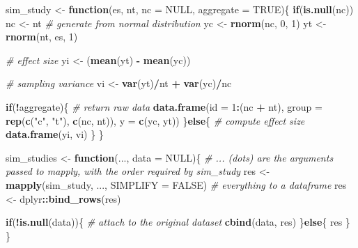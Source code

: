 \documentclass[
  man,floatsintext]{apa6}
\newenvironment{Shaded}{\begin{snugshade}}{\end{snugshade}}
\newcommand{\AttributeTok}[1]{\textcolor[rgb]{0.13,0.29,0.53}{#1}}
\newcommand{\CommentTok}[1]{\textcolor[rgb]{0.56,0.35,0.01}{\textit{#1}}}
\newcommand{\ConstantTok}[1]{\textcolor[rgb]{0.56,0.35,0.01}{#1}}
\newcommand{\ControlFlowTok}[1]{\textcolor[rgb]{0.13,0.29,0.53}{\textbf{#1}}}
\newcommand{\DecValTok}[1]{\textcolor[rgb]{0.00,0.00,0.81}{#1}}
\newcommand{\FunctionTok}[1]{\textcolor[rgb]{0.13,0.29,0.53}{\textbf{#1}}}
\newcommand{\NormalTok}[1]{#1}
\newcommand{\OtherTok}[1]{\textcolor[rgb]{0.56,0.35,0.01}{#1}}
\newcommand{\SpecialCharTok}[1]{\textcolor[rgb]{0.81,0.36,0.00}{\textbf{#1}}}
\newcommand{\StringTok}[1]{\textcolor[rgb]{0.31,0.60,0.02}{#1}}
\begin{document}
\begin{Shaded}
\begin{Highlighting}[]

\NormalTok{sim\_study }\OtherTok{\textless{}{-}} \ControlFlowTok{function}\NormalTok{(es, nt, }\AttributeTok{nc =} \ConstantTok{NULL}\NormalTok{, }\AttributeTok{aggregate =} \ConstantTok{TRUE}\NormalTok{)\{}
  \ControlFlowTok{if}\NormalTok{(}\FunctionTok{is.null}\NormalTok{(nc)) nc }\OtherTok{\textless{}{-}}\NormalTok{ nt}
  \CommentTok{\# generate from normal distribution}
\NormalTok{  yc }\OtherTok{\textless{}{-}} \FunctionTok{rnorm}\NormalTok{(nc, }\DecValTok{0}\NormalTok{, }\DecValTok{1}\NormalTok{)}
\NormalTok{  yt }\OtherTok{\textless{}{-}} \FunctionTok{rnorm}\NormalTok{(nt, es, }\DecValTok{1}\NormalTok{)}
  
  \CommentTok{\# effect size}
\NormalTok{  yi }\OtherTok{\textless{}{-}}\NormalTok{ (}\FunctionTok{mean}\NormalTok{(yt) }\SpecialCharTok{{-}} \FunctionTok{mean}\NormalTok{(yc))}
  
  \CommentTok{\# sampling variance}
\NormalTok{  vi }\OtherTok{\textless{}{-}} \FunctionTok{var}\NormalTok{(yt)}\SpecialCharTok{/}\NormalTok{nt }\SpecialCharTok{+} \FunctionTok{var}\NormalTok{(yc)}\SpecialCharTok{/}\NormalTok{nc}
  
  \ControlFlowTok{if}\NormalTok{(}\SpecialCharTok{!}\NormalTok{aggregate)\{}
    \CommentTok{\# return raw data}
    \FunctionTok{data.frame}\NormalTok{(}\AttributeTok{id =} \DecValTok{1}\SpecialCharTok{:}\NormalTok{(nc }\SpecialCharTok{+}\NormalTok{ nt),}
               \AttributeTok{group =} \FunctionTok{rep}\NormalTok{(}\FunctionTok{c}\NormalTok{(}\StringTok{"c"}\NormalTok{, }\StringTok{"t"}\NormalTok{), }\FunctionTok{c}\NormalTok{(nc, nt)),}
               \AttributeTok{y =} \FunctionTok{c}\NormalTok{(yc, yt))}
\NormalTok{  \}}\ControlFlowTok{else}\NormalTok{\{}
    \CommentTok{\# compute effect size}
    \FunctionTok{data.frame}\NormalTok{(yi, vi)}
\NormalTok{  \}}
\NormalTok{\}}

\NormalTok{sim\_studies }\OtherTok{\textless{}{-}} \ControlFlowTok{function}\NormalTok{(..., }\AttributeTok{data =} \ConstantTok{NULL}\NormalTok{)\{}
  \CommentTok{\# ... (dots) are the arguments passed to mapply, with the order required by sim\_study}
\NormalTok{  res }\OtherTok{\textless{}{-}} \FunctionTok{mapply}\NormalTok{(sim\_study, ..., }\AttributeTok{SIMPLIFY =} \ConstantTok{FALSE}\NormalTok{)}
  \CommentTok{\# everything to a dataframe}
\NormalTok{  res }\OtherTok{\textless{}{-}}\NormalTok{ dplyr}\SpecialCharTok{::}\FunctionTok{bind\_rows}\NormalTok{(res)}
  
  \ControlFlowTok{if}\NormalTok{(}\SpecialCharTok{!}\FunctionTok{is.null}\NormalTok{(data))\{}
    \CommentTok{\# attach to the original dataset}
    \FunctionTok{cbind}\NormalTok{(data, res)}
\NormalTok{  \}}\ControlFlowTok{else}\NormalTok{\{}
\NormalTok{    res}
\NormalTok{  \}}
\NormalTok{\}}
\end{Highlighting}
\end{Shaded}
\end{document}
